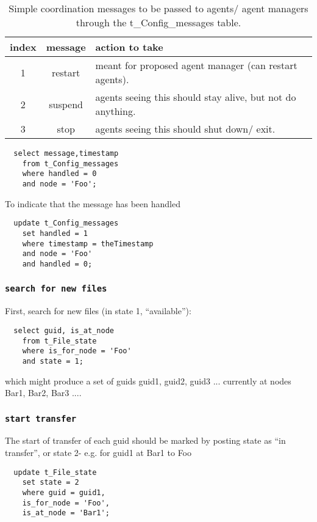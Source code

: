 \documentclass{cmspaper}
\begin{document}
\begin{table}
\centering
\begin{tabular}[!h]{|c|c|l|} 
\hline index & message & action to take
\\ \hline
	1 & restart & meant for proposed agent manager (can restart agents).
\\	2 & suspend & agents seeing this should stay alive, but not do anything.
\\	3 & stop & agents seeing this should shut down/ exit.
\\ \hline
\end{tabular}
\caption{Simple coordination messages to be passed to agents/ agent managers through the t\_Config\_messages table.}
\label{table:messages}
\end{table}

{\small\begin{verbatim}
  select message,timestamp
  	from t_Config_messages
  	where handled = 0
  	and node = 'Foo';
\end{verbatim}}

To indicate that the message has been handled

{\small\begin{verbatim}
  update t_Config_messages
  	set handled = 1
  	where timestamp = theTimestamp
  	and node = 'Foo'
  	and handled = 0;
\end{verbatim}}

\subsubsection{\textbf{\texttt{search for new files}}}
First, search for new files (in state 1, ``available''):

{\small\begin{verbatim}
  select guid, is_at_node
    from t_File_state
    where is_for_node = 'Foo'
    and state = 1;
\end{verbatim}}

which might produce a set of guids {guid1, guid2, guid3 ...} currently at nodes {Bar1, Bar2, Bar3 ...}. 

\subsubsection{\textbf{\texttt{start transfer}}}
The start of transfer of each guid should be marked by posting state as ``in transfer'', or state 2- e.g. for guid1 at Bar1 to Foo

{\small\begin{verbatim}
  update t_File_state
    set state = 2
    where guid = guid1,
    is_for_node = 'Foo',
    is_at_node = 'Bar1';
  \end{verbatim}}
\end{document}
